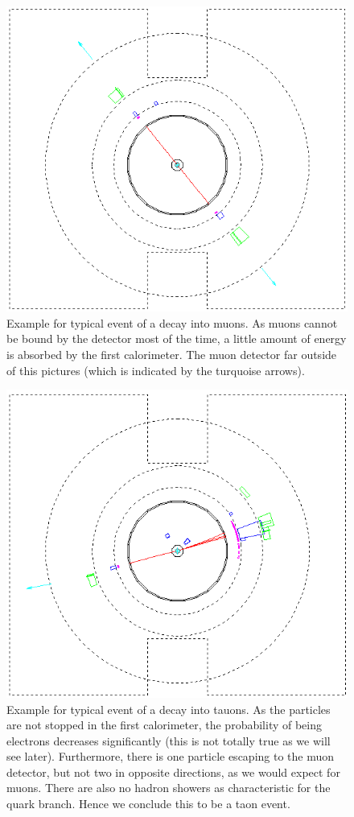 \begin{figure}[htpb]
    \centering
    \includegraphics[width=0.8\linewidth]{figures/mm_02.png}
    \caption{Example for typical event of a decay into muons. As muons cannot be bound by the detector most of the time,
        a little amount of energy is absorbed by the first calorimeter. The muon detector far outside of this pictures (which
    is indicated by the turquoise arrows). }
\label{fig:mm}
\end{figure}

\begin{figure}[htpb]
    \centering
    \includegraphics[width=0.8\linewidth]{figures/tt_02.png}
    \caption{Example for typical event of a decay into tauons. As the particles are not stopped in the first calorimeter,
    the probability of being electrons decreases significantly (this is not totally true as we will see later). Furthermore,
there is one particle escaping to the muon detector, but not two in opposite directions, as we would expect for muons. There
are also no hadron showers as characteristic for the quark branch. Hence we conclude this to be a taon event. }
\label{fig:tt}
\end{figure}

